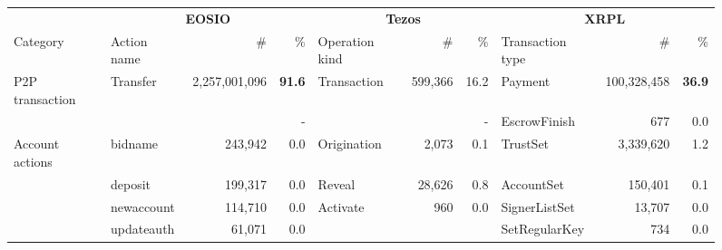 \begin{figure*}[tbp]
	\centering
	\setlength{\tabcolsep}{2.2pt}
	\footnotesize
	\begin{tabular}{@{}lp{0.7in}rrp{1.2in}rrp{0.9in}rr@{}}
		\toprule
		                & \multicolumn{3}{c}{\textbf{EOSIO}} & \multicolumn{3}{c}{\textbf{Tezos}} & \multicolumn{3}{c}{\textbf{ XRPL }}                                                                                                                                     \\
		Category        & Action name                        & \#                                 & \%                                  & Operation kind         & \#        & \%                         & Transaction type     & \#          & \%                         \\
		\cmidrule(r){1-1} \cmidrule(rl){2-4} \cmidrule(rl){5-7} \cmidrule(l){8-10}
		P2P transaction & Transfer                           & 2,257,001,096                      & \textbf{             91.6}          & Transaction            & 599,366   & 16.2                       & Payment              & 100,328,458 & \textbf{             36.9} \\
		                &                                    &                                    & -                                   &                        &           & -                          & EscrowFinish         & 677         & 0.0                        \\
		\cmidrule(r){1-1} \cmidrule(rl){2-4} \cmidrule(rl){5-7} \cmidrule(l){8-10}
		Account actions & bidname                            & 243,942                            & 0.0                                 & Origination            & 2,073     & 0.1                        & TrustSet             & 3,339,620   & 1.2                        \\
		                & deposit                            & 199,317                            & 0.0                                 & Reveal                 & 28,626    & 0.8                        & AccountSet           & 150,401     & 0.1                        \\
		                & newaccount                         & 114,710                            & 0.0                                 & Activate               & 960       & 0.0                        & SignerListSet        & 13,707      & 0.0                        \\
		                & updateauth                         & 61,071                             & 0.0                                 &                        &           &                            & SetRegularKey        & 734         & 0.0                        \\

\end{tabular}
\end{figure*}
